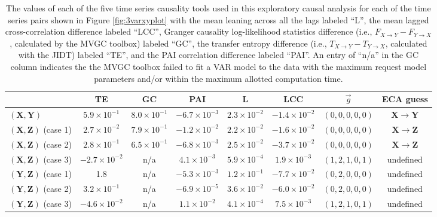 \begin{table}
\begin{center}
\begin{tabular}{lccccccc}
  & TE & GC & PAI & L & LCC & $\vec{g}$ & ECA guess\\
\midrule
$(\mathbf{X},\mathbf{Y})$ & $5.9\times 10^{-1}$ & $8.0\times 10^{-1}$ & $-6.7\times 10^{-3}$ & $2.3\times 10^{-2}$ & $-1.4\times 10^{-2}$ & $(0,0,0,0,0)$ & $\mathbf{X}\rightarrow\mathbf{Y}$\\
$(\mathbf{X},\mathbf{Z})$ (case 1) & $2.7\times 10^{-2}$ & $7.9\times 10^{-1}$ & $-1.2\times 10^{-2}$ & $2.2\times 10^{-2}$ & $-1.6\times 10^{-2}$ & $(0,0,0,0,0)$ & $\mathbf{X}\rightarrow\mathbf{Z}$\\
$(\mathbf{X},\mathbf{Z})$ (case 2) & $2.8\times 10^{-1}$ & $6.5\times 10^{-1}$ & $-6.8\times 10^{-3}$ & $2.5\times 10^{-2}$ & $-3.7\times 10^{-2}$ & $(0,0,0,0,0)$ & $\mathbf{X}\rightarrow\mathbf{Z}$\\
$(\mathbf{X},\mathbf{Z})$ (case 3) & $-2.7\times 10^{-2}$ & n/a & $4.1\times 10^{-3}$ & $5.9\times 10^{-4}$ & $1.9\times 10^{-3}$ & $(1,2,1,0,1)$ & undefined\\
$(\mathbf{Y},\mathbf{Z})$ (case 1) & 1.8 & n/a & $-5.3\times 10^{-3}$ & $1.2\times 10^{-1}$ & $-7.7\times 10^{-2}$ & $(0,2,0,0,0)$ & undefined\\
$(\mathbf{Y},\mathbf{Z})$ (case 2) & $3.2\times 10^{-1}$ & n/a & $-6.9\times 10^{-5}$ & $3.6\times 10^{-2}$ & $-6.0\times 10^{-2}$ & $(0,2,0,0,0)$ & undefined\\
$(\mathbf{Y},\mathbf{Z})$ (case 3) & $-4.6\times 10^{-2}$ & n/a & $1.1\times 10^{-2}$ & $4.1\times 10^{-4}$ & $7.5\times 10^{-3}$ & $(1,2,1,0,1)$ & undefined\\
\end{tabular}
\caption[The values of each of the five time series causality tools]{The values of each of the five time series causality tools used in this exploratory causal analysis for each of the time series pairs shown in Figure \ref{fig:3varxyplot} with the mean leaning across all the lags labeled ``L'', the mean lagged cross-correlation difference labeled ``LCC'', Granger causality log-likelihood statistics difference (i.e., $F_{X\rightarrow Y}-F_{Y\rightarrow X}$, calculated by the MVGC toolbox) labeled ``GC'', the transfer entropy difference (i.e., $T_{X\rightarrow Y}-T_{Y\rightarrow X}$, calculated with the JIDT) labeled ``TE'', and the PAI correlation difference labeled ``PAI''.  An entry of ``n/a'' in the GC column indicates the the MVGC toolbox failed to fit a VAR model to the data with the maximum request model parameters and/or within the maximum allotted computation time.}
\label{tab:3varEx}
\end{center}
\end{table}
